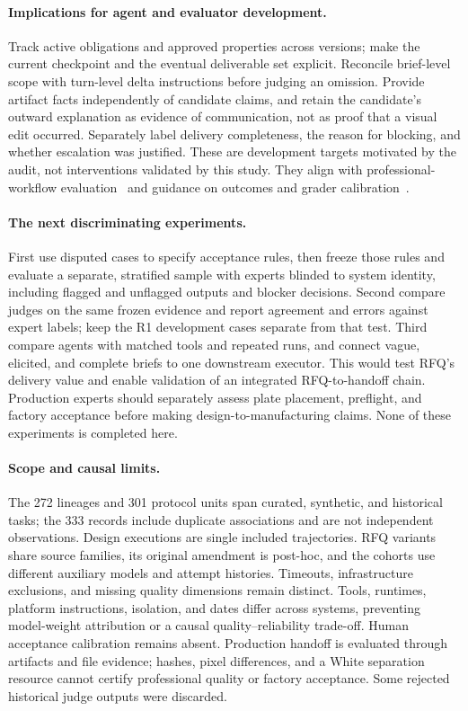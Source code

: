 \paragraph{Implications for agent and evaluator development.}
Track active obligations and approved properties across versions; make the current checkpoint and the eventual deliverable set explicit. Reconcile brief-level scope with turn-level delta instructions before judging an omission. Provide artifact facts independently of candidate claims, and retain the candidate's outward explanation as evidence of communication, not as proof that a visual edit occurred. Separately label delivery completeness, the reason for blocking, and whether escalation was justified. These are development targets motivated by the audit, not interventions validated by this study. They align with professional-workflow evaluation~\citep{openai2026ironclad} and guidance on outcomes and grader calibration~\citep{anthropic2026evals}.

\paragraph{The next discriminating experiments.}
First use disputed cases to specify acceptance rules, then freeze those rules and evaluate a separate, stratified sample with experts blinded to system identity, including flagged and unflagged outputs and blocker decisions. Second compare judges on the same frozen evidence and report agreement and errors against expert labels; keep the R1 development cases separate from that test. Third compare agents with matched tools and repeated runs, and connect vague, elicited, and complete briefs to one downstream executor. This would test RFQ's delivery value and enable validation of an integrated RFQ-to-handoff chain. Production experts should separately assess plate placement, preflight, and factory acceptance before making design-to-manufacturing claims. None of these experiments is completed here.

\paragraph{Scope and causal limits.}
The 272 lineages and 301 protocol units span curated, synthetic, and historical tasks; the 333 records include duplicate associations and are not independent observations. Design executions are single included trajectories. RFQ variants share source families, its original amendment is post-hoc, and the cohorts use different auxiliary models and attempt histories. Timeouts, infrastructure exclusions, and missing quality dimensions remain distinct. Tools, runtimes, platform instructions, isolation, and dates differ across systems, preventing model-weight attribution or a causal quality--reliability trade-off. Human acceptance calibration remains absent. Production handoff is evaluated through artifacts and file evidence; hashes, pixel differences, and a White separation resource cannot certify professional quality or factory acceptance. Some rejected historical judge outputs were discarded.

